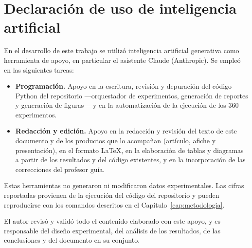 \chapter*{Declaración de uso de inteligencia artificial}

En el desarrollo de este trabajo se utilizó inteligencia artificial
generativa como herramienta de apoyo, en particular el asistente Claude
(Anthropic). Se empleó en las siguientes tareas:

\begin{itemize}
  \item \textbf{Programación.} Apoyo en la escritura, revisión y depuración
    del código Python del repositorio —orquestador de experimentos,
    generación de reportes y generación de figuras— y en la automatización
    de la ejecución de los 360 experimentos.
  \item \textbf{Redacción y edición.} Apoyo en la redacción y revisión del
    texto de este documento y de los productos que lo acompañan (artículo,
    afiche y presentación), en el formato \LaTeX{}, en la elaboración de
    tablas y diagramas a partir de los resultados y del código existentes, y
    en la incorporación de las correcciones del profesor guía.
\end{itemize}

Estas herramientas no generaron ni modificaron datos experimentales. Las
cifras reportadas provienen de la ejecución del código del repositorio y
pueden reproducirse con los comandos descritos en el
Capítulo~\ref{cap:metodologia}.

El autor revisó y validó todo el contenido elaborado con este apoyo, y es
responsable del diseño experimental, del análisis de los resultados, de las
conclusiones y del documento en su conjunto.
